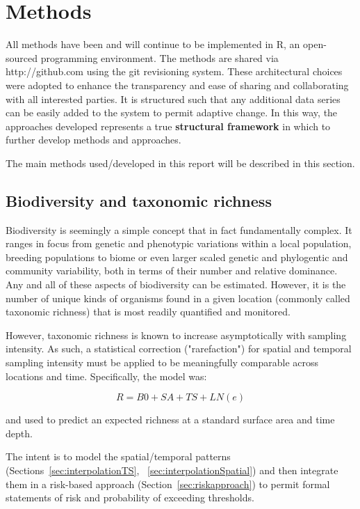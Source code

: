 \documentclass[letterpaper,portrait,11pt]{scrartcl}
\numberwithin{equation}{section}		%
\numberwithin{figure}{section}		%
\numberwithin{table}{section}				%
\begin{document}
\clearpage
\section{Methods}

All methods have been and will continue to be implemented in R, an open-sourced programming environment. The methods are shared via http://github.com using the git revisioning system. These architectural choices were adopted to enhance the transparency and ease of sharing and collaborating with all interested parties. It is structured such that any additional data series can be easily added to the system to permit adaptive change. In this way, the approaches developed represents a true \textbf{structural framework} in which to further develop methods and approaches. 

The main methods used/developed in this report will be described in this section.


\subsection{Biodiversity and taxonomic richness}


Biodiversity is seemingly a simple concept that in fact fundamentally complex. It ranges in focus from genetic and phenotypic variations within a local population, breeding populations to biome or even larger scaled genetic and phylogentic and community variability, both in terms of their number and relative dominance. Any and all of these aspects of biodiversity can be estimated. However, it is the number of unique kinds of organisms found in a given location (commonly called taxonomic richness) that is most readily quantified and monitored. 

However, taxonomic richness is known to increase asymptotically with sampling intensity. As such, a statistical correction ("rarefaction") for spatial and temporal sampling intensity must be applied to be meaningfully comparable across locations and time. Specifically, the model was:

\[
R = B0 + SA + TS + LN(e)
\]

and used to predict an expected richness at a standard surface area and time depth. 

The intent is to model the spatial/temporal patterns (Sections~\ref{sec:interpolationTS}, ~\ref{sec:interpolationSpatial}) and then integrate them in a risk-based approach (Section~\ref{sec:riskapproach}) to permit formal statements of risk and probability of exceeding thresholds. 
\end{document}

